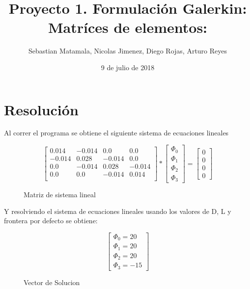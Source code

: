 \documentclass{article}
\title{Proyecto 1. Formulación Galerkin: Matríces de elementos: }
\author{Sebastian Matamala, Nicolas Jimenez, Diego Rojas, Arturo Reyes}
\date{9 de julio de 2018}
\begin{document}
\maketitle


\newpage


\section{Resolución}

Al correr el programa se obtiene el siguiente sistema de ecuaciones lineales

\begin{figure}[!h]
    \centering
    \[
    \begin{bmatrix}
        {0.014} & {-0.014} & {0.0} & {0.0}\\
        {-0.014} & {0.028} & {-0.014} & {0.0}\\
        {0.0} & {-0.014} & {0.028} & {-0.014}\\
        {0.0} & {0.0} & {-0.014} & {0.014}\\
    \end{bmatrix}
    *
    \begin{bmatrix}
        {\Phi_0}\\
        {\Phi_1}\\
        {\Phi_2}\\
        {\Phi_3}
    \end{bmatrix}
    =
    \begin{bmatrix}
        {0}\\
        {0}\\
        {0}\\
        {0}
    \end{bmatrix}
    \]
    \caption{Matriz de sistema lineal}

\end{figure}
Y resolviendo el sistema de ecuaciones lineales usando los valores de D, L y frontera por defecto se obtiene:
\begin{figure}[!h]
    
    \[
        \begin{bmatrix}
            {\Phi_0 = 20}\\
            {\Phi_1 = 20}\\
            {\Phi_2 = 20}\\
            {\Phi_3 = -15}
        \end{bmatrix}
    \]
    \caption{Vector de Solucion}
\end{figure}
\end{document}

